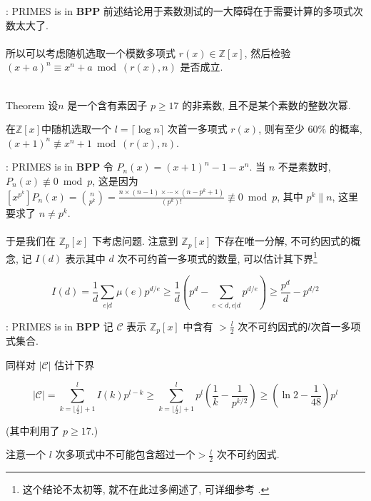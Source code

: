 \documentclass{beamer}
\def\ge{\geqslant}
\begin{document}
\begin{frame}{\cite{AB99}: \textsf{PRIMES} is in \textbf{BPP}}
	前述结论用于素数测试的一大障碍在于需要计算的多项式次数太大了.\\~\\
	
	所以可以考虑随机选取一个模数多项式 $r(x) \in \mathbb Z[x]$, 然后检验$(x + a)^n \equiv x^n + a \bmod (r(x), n)$ 是否成立.\\~\\

	\begin{block}{Theorem}
		设$n$ 是一个含有素因子 $p \ge 17$ 的非素数, 且不是某个素数的整数次幂.
		
		在$\mathbb Z[x]$中随机选取一个 $l = \lceil \log n \rceil$ 次首一多项式 $r(x)$, 则有至少 $60\%$ 的概率, $(x + 1)^n \not\equiv x^n + 1 \bmod (r(x), n)$.
	\end{block}
	
\end{frame}
\begin{frame}{\cite{AB99}: \textsf{PRIMES} is in \textbf{BPP}}
	令 $P_n(x) = (x + 1)^n - 1 - x^n$. 当 $n$ 不是素数时, $P_n(x) \not\equiv 0 \bmod p$, 这是因为$[x^{p^k}] P_n(x) = \binom{n}{p^k} = \frac{n \times (n-1) \times \cdots \times (n-p^k+1)}{(p^k)!} \not\equiv 0 \bmod p$, 其中 $p^k \| n$, 这里要求了 $n \neq p^k$.\\~\\

	于是我们在 $\mathbb Z_p[x]$ 下考虑问题. 注意到 $\mathbb Z_p[x]$ 下存在唯一分解, 不可约因式的概念, 记 $I(d)$ 表示其中 $d$ 次不可约首一多项式的数量, 可以估计其下界\footnote{\tiny 这个结论不太初等, 就不在此过多阐述了, 可详细参考 \cite{lidl_niederreiter_1994}.}

	$$ I(d) = \frac{1}{d}\sum_{e | d}\mu(e)p^{d/e} \ge \frac{1}{d}\left( p^d -  \sum_{e < d, e | d}p^{d/e}\right) \ge \frac{p^d}{d} - p^{d/2} $$
\end{frame}
\begin{frame}{\cite{AB99}: \textsf{PRIMES} is in \textbf{BPP}}
	记 $\mathcal C$ 表示 $\mathbb Z_p[x]$ 中含有 $> \frac{l}{2}$ 次不可约因式的$l$次首一多项式集合. 
	
	同样对 $|\mathcal C|$ 估计下界

	$$|\mathcal C| = \sum_{k = \lfloor \frac l2 \rfloor + 1}^{l}I(k)p^{l-k} \ge \sum_{k = \lfloor \frac l2 \rfloor + 1}^{l}p^l\left(\frac 1k - \frac{1}{p^{k/2}}\right) \ge \left(\ln 2 - \frac{1}{48}\right)p^l$$

	(其中利用了 $p \ge 17$.)

	注意一个 $l$ 次多项式中不可能包含超过一个$> \frac{l}{2}$ 次不可约因式.
\end{frame}
\end{document}
